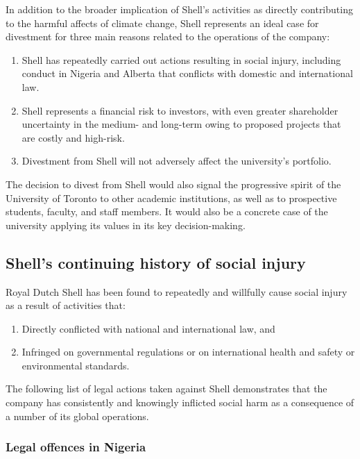 			
In addition to the broader implication of Shell's activities as directly contributing to the harmful affects of climate change, Shell represents an ideal case for divestment for three main reasons related to the operations of the company: 
\begin{enumerate}
	\item Shell has repeatedly carried out actions resulting in social injury, including conduct in Nigeria and Alberta that conflicts with domestic and international law.
	\item Shell represents a financial risk to investors, with even greater shareholder uncertainty in the medium- and long-term owing to proposed projects that are costly and high-risk.
	\item Divestment from Shell will not adversely affect the university's portfolio.
\end{enumerate}
The decision to divest from Shell would also signal the progressive spirit of the University of Toronto to other academic institutions, as well as to prospective students, faculty, and staff members.
It would also be a concrete case of the university applying its values in its key decision-making.



	\subsection{Shell's continuing history of social injury}



Royal Dutch Shell has been found to repeatedly and willfully cause social injury as a result of activities that:
\begin{enumerate}
	\item Directly conflicted with national and international law, and
	\item Infringed on governmental regulations or on international health and safety or environmental standards. 
\end{enumerate}
The following list of legal actions taken against Shell demonstrates that the company has consistently and knowingly inflicted social harm as a consequence of a number of its global operations.



	\subsubsection{Legal offences in Nigeria}



